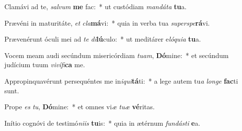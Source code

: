 \item Clamávi ad te, \textit{sal}\textit{vum} \textbf{me} fac:~* ut custódiam \textit{man}\textit{dá}\textit{ta} \textbf{tu}a.
\item Prævéni in maturitáte, \textit{et} \textit{cla}\textbf{má}vi:~* quia in verba tua \textit{su}\textit{per}\textit{spe}\textbf{rá}vi.
\item Prævenérunt óculi mei ad \textit{te} \textit{di}\textbf{lú}culo:~* ut meditárer e\textit{ló}\textit{qui}\textit{a} \textbf{tu}a.
\item Vocem meam audi secúndum misericórdiam \textit{tu}\textit{am}, \textbf{Dó}mine:~* et secúndum judícium tuum \textit{vi}\textit{ví}\textit{fi}\textbf{ca} me.
\item Appropinquavérunt persequéntes me in\textit{i}\textit{qui}\textbf{tá}ti:~* a lege autem tu\textit{a} \textit{lon}\textit{ge} \textbf{fac}ti sunt.
\item Prope \textit{es} \textit{tu}, \textbf{Dó}mine:~* et omnes vi\textit{æ} \textit{tu}\textit{æ} \textbf{vé}ritas.
\item Inítio cognóvi de testimó\textit{ni}\textit{is} \textbf{tu}is:~* quia in ætérnum \textit{fun}\textit{dás}\textit{ti} \textbf{e}a.

